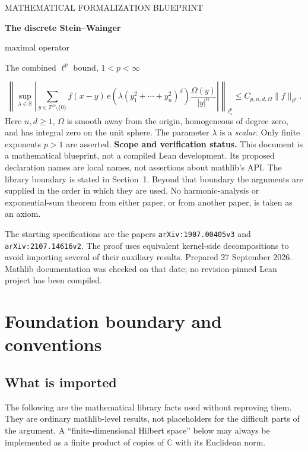 \documentclass[11pt,oneside]{article}
\theoremstyle{definition}\newtheorem{definition}[theorem]{Definition}
\theoremstyle{remark}\newtheorem{remark}[theorem]{Remark}
\newcommand{\R}{\mathbb R}\newcommand{\Z}{\mathbb Z}\newcommand{\N}{\mathbb N}\newcommand{\Q}{\mathbb Q}\newcommand{\C}{\mathbb C}\newcommand{\T}{\mathbb T}
\begin{document}
\hypersetup{pageanchor=false}
\begin{titlepage}
\vspace*{14mm}
{\Large\sffamily MATHEMATICAL FORMALIZATION BLUEPRINT\par}
\vspace{12mm}
{\huge\bfseries The discrete Stein--Wainger\par maximal operator\par}
\vspace{7mm}
{\LARGE The combined $\ell^p$ bound, $1<p<\infty$\par}
\vspace{14mm}
\[
 \left\|\sup_{\lambda\in\R}\left|
 \sum_{y\in\Z^n\setminus\{0\}}
 f(x-y)\,\mathrm e\!\left(\lambda
       (y_1^2+\cdots+y_n^2)^d\right)
 \frac{\Omega(y)}{|y|^n}\right|\right\|_{\ell^p_x}
 \leq C_{p,n,d,\Omega}\|f\|_{\ell^p}.
\]
\vspace{10mm}
Here $n,d\geq1$, $\Omega$ is smooth away from the origin, homogeneous of
 degree zero, and has integral zero on the unit sphere. The parameter
 $\lambda$ is a \emph{scalar}. Only finite exponents $p>1$ are asserted.
\vfill
\textbf{Scope and verification status.}
This document is a mathematical blueprint, not a compiled Lean development.
Its proposed declaration names are local names, not assertions about mathlib's
API. The library boundary is stated in Section~1. Beyond that boundary the
arguments are supplied in the order in which they are used. No harmonic-analysis
or exponential-sum theorem from either paper, or from another paper, is taken
as an axiom.

The starting specifications are the papers
\texttt{arXiv:1907.00405v3} and \texttt{arXiv:2107.14616v2}.
The proof uses equivalent kernel-side decompositions to avoid importing
several of their auxiliary results.
\vspace{8mm}
{\small Prepared 27 September 2026. Mathlib documentation was checked on that
 date; no revision-pinned Lean project has been compiled.}
\end{titlepage}
\hypersetup{pageanchor=true}
\tableofcontents
\clearpage{}

\section{Foundation boundary and conventions}\label{sec:foundation}

\subsection{What is imported}
The following are the mathematical library facts used without reproving them.
They are ordinary mathlib-level results, not placeholders for the difficult
parts of the argument. A ``finite-dimensional Hilbert space'' below may always
be implemented as a finite product of copies of $\C$ with its Euclidean norm.
\end{document}
